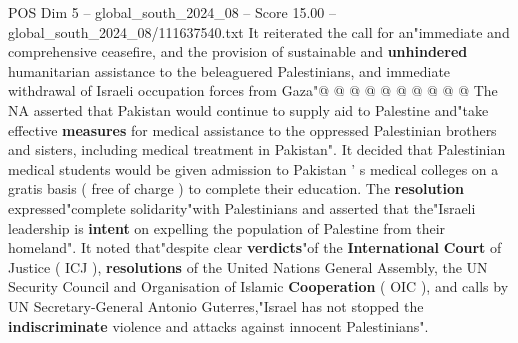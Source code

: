 \begin{textsample}{POS Dim 5 – global\_south\_2024\_08 – Score 15.00 – global\_south\_2024\_08/111637540.txt}
It reiterated the call for an"immediate and comprehensive ceasefire, and the provision of sustainable and \textbf{unhindered} humanitarian assistance to the beleaguered Palestinians, and immediate withdrawal of Israeli occupation forces from Gaza"@ @ @ @ @ @ @ @ @ @ The NA asserted that Pakistan would continue to supply aid to Palestine and"take effective \textbf{measures} for medical assistance to the oppressed Palestinian brothers and sisters, including medical treatment in Pakistan".
It decided that Palestinian medical students would be given admission to Pakistan ' s medical colleges on a gratis basis ( free of charge ) to complete their education.
The \textbf{resolution} expressed"complete solidarity"with Palestinians and asserted that the"Israeli leadership is \textbf{intent} on expelling the population of Palestine from their homeland".
It noted that"despite clear \textbf{verdicts}"of the \textbf{International} \textbf{Court} of Justice ( ICJ ), \textbf{resolutions} of the United Nations General Assembly, the UN Security Council and Organisation of Islamic \textbf{Cooperation} ( OIC ), and calls by UN Secretary-General Antonio Guterres,"Israel has not stopped the \textbf{indiscriminate} violence and attacks against innocent Palestinians".

\end{textsample}
